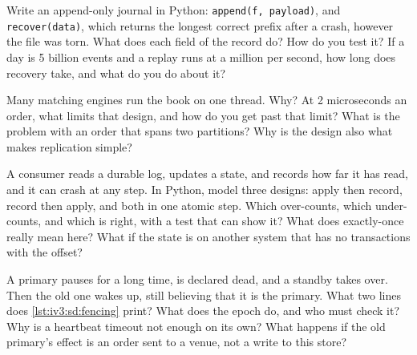 \begin{question}\label{iq:iv3:system-design:30}
Write an append-only journal in Python: \texttt{append(f, payload)}, and \texttt{recover(data)}, which returns the longest correct prefix after a crash, however the file was torn. What does each field of the record do? How do you test it? If a day is 5 billion events and a replay runs at a million per second, how long does recovery take, and what do you do about it?
\end{question}

\begin{question}\label{iq:iv3:system-design:31}
Many matching engines run the book on one thread. Why? At 2 microseconds an order, what limits that design, and how do you get past that limit? What is the problem with an order that spans two partitions? Why is the design also what makes replication simple?
\end{question}

\begin{question}\label{iq:iv3:system-design:32}
A consumer reads a durable log, updates a state, and records how far it has read, and it can crash at any step. In Python, model three designs: apply then record, record then apply, and both in one atomic step. Which over-counts, which under-counts, and which is right, with a test that can show it? What does exactly-once really mean here? What if the state is on another system that has no transactions with the offset?
\end{question}

\begin{question}\label{iq:iv3:system-design:33}
A primary pauses for a long time, is declared dead, and a standby takes over. Then the old one wakes up, still believing that it is the primary. What two lines does \cref{lst:iv3:sd:fencing} print? What does the epoch do, and who must check it? Why is a heartbeat timeout not enough on its own? What happens if the old primary's effect is an order sent to a venue, not a write to this store?
\label{lst:iv3:sd:fencing}
\end{question}

